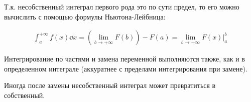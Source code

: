 
Т.к. несобственный интеграл первого рода это по сути предел, то его можно
вычислить с помощью формулы Ньютона-Лейбница:

\begin{align*}
  \int_{a}^{+\infty} f(x) \dd x
  = \left( \lim_{b \to +\infty} F(b) \right) - F(a)
  = \lim_{b \to +\infty} F(x) \bigg\vert_{a}^{b}
\end{align*}

Интегрирование по частями и замена переменной выполняются также, как и в
определенном интеграле (аккуратнее с пределами интегрирования при замене).

\begin{remark}
  Иногда после замены несобственный интеграл может превратиться в собственный.
\end{remark}